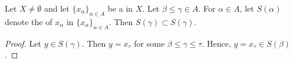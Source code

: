 \begin{prop}
    \label{def:NetSection}
    Let $X \neq \emptyset$ 
    and let $\{x_\alpha\}_{\alpha \in A}$ 
    be a \Net in $X$. 
    Let $\beta \leq \gamma \in A$. 
    For $\alpha \in A$, let 
    $S(\alpha)$ denote the \NetSection
    of $x_\alpha$ in $\{x_\alpha\}_{\alpha \in A}$. 
    Then $S(\gamma) \subset S(\gamma)$. 
    \begin{proof}
        Let $y \in S(\gamma)$.
        Then $y=x_\tau$ for some $\beta \leq \gamma \leq \tau$. 
        Hence, $y=x_\tau \in S(\beta)$. 

    \end{proof}
\end{prop}
